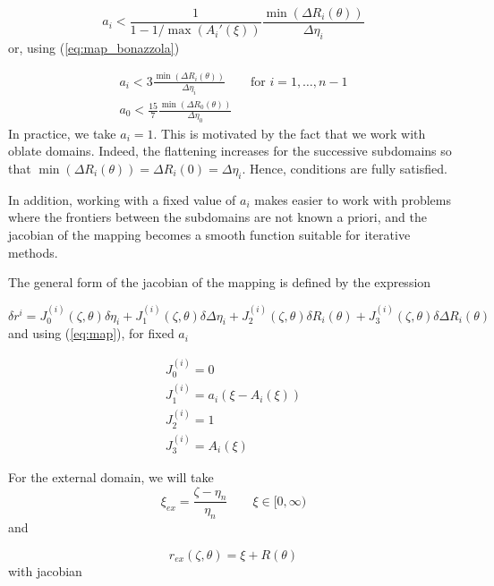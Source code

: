 \begin{equation}
a_i<\frac{1}{1-1/\max(A_i'(\xi))}\frac{\min(\Delta R_i(\theta))}{\Delta\eta_i}
\end{equation}
or, using (\ref{eq:map_bonazzola})

\begin{equation}
\begin{array}{l}
\displaystyle a_i<3\frac{\min(\Delta R_i(\theta))}{\Delta\eta_i} \qquad \mbox{for $i=1,\ldots,n-1$}\\
\displaystyle a_0<\frac{15}{7}\frac{\min(\Delta R_0(\theta))}{\Delta\eta_0}
\end{array}
\label{cdtstab}
\end{equation}
In practice, we take $a_i=1$. This is motivated by the fact that
we work with oblate domains. Indeed, the flattening increases for
the successive subdomains so that $\min(\Delta R_i(\theta))=\Delta
R_i(0)=\Delta\eta_i$. Hence, conditions  are fully satisfied.

In addition, working with a fixed value of $a_i$ makes easier to work
with problems where the frontiers between the subdomains are not known
a priori, and the jacobian of the mapping becomes a smooth function
suitable for iterative methods.

The general form of the jacobian of the mapping is defined by the expression

\begin{equation}
\delta r^{i}=J_0^{(i)}(\zeta,\theta)\delta\eta_i+J_1^{(i)}(\zeta,\theta)\delta\Delta\eta_i
+J_2^{(i)}(\zeta,\theta)\delta R_i(\theta)+J_3^{(i)}(\zeta,\theta)\delta\Delta R_i(\theta)
\end{equation}
and using (\ref{eq:map}), for fixed $a_i$

\begin{equation}
\begin{array}{l}
J_0^{(i)}=0\\
J_1^{(i)}=a_i(\xi-A_i(\xi))\\
J_2^{(i)}=1\\
J_3^{(i)}=A_i(\xi)
\end{array}
\end{equation}

For the external domain, we will take 
\begin{equation}
\xi_{ex}=\frac{\zeta-\eta_n}{\eta_n} \qquad \xi\in[0,\infty)
\end{equation}
and

\begin{equation}
r_{ex}(\zeta,\theta)=\xi+R(\theta)
\end{equation}
with jacobian

